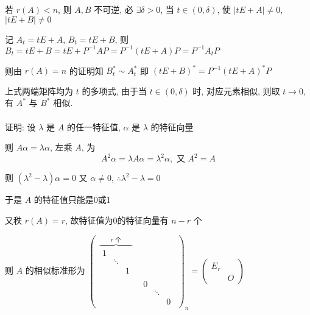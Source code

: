 		 若 \( r(A) < n \), 则 \( A, B \) 不可逆, 必 \( \exists \delta > 0 \), 当 \( t \in (0,\delta) \), 使 \( |tE+A| \neq 0 \), \( |tE+B| \neq 0 \)

		 记 \( A_{t} = tE+A \), \( B_{t} = tE+B \), 则 \( B_{t} = tE+B = tE+P^{-1}AP = P^{-1}(tE+A)P = P^{-1}A_{t}P \)

		 则由 \( r(A) = n \) 的证明知 \( B_{t}^{*} \sim A_{t}^{*} \) 即 \( (tE+B)^{*} = P^{-1}(tE+A)^{*}P \)

		 上式两端矩阵均为 \( t \) 的多项式, 由于当 \( t \in (0,\delta) \) 时, 对应元素相似, 则取 \( t \to 0 \), 有 \( A^{*} \) 与 \( B^{*} \) 相似.


	 \paragraph{} %
		 证明: 设 \( \lambda \) 是 \( A \) 的任一特征值, \( \alpha \) 是 \( \lambda \) 的特征向量

		 则 \( A\alpha = \lambda\alpha \), 左乘 \( A \), 为
		 \[ A^{2}\alpha = \lambda A\alpha = \lambda^{2}\alpha, \text{ 又 } A^{2} = A \]

		 则 \( (\lambda^{2}-\lambda)\alpha = 0 \) 又 \( \alpha \neq 0 \), \( \therefore \lambda^{2}-\lambda = 0 \)

		 于是 \( A \) 的特征值只能是0或1

		 又秩 \( r(A) = r \), 故特征值为0的特征向量有 \( n-r \) 个

		 则 \( A \) 的相似标准形为 \( \begin{pmatrix}
			 \overbrace{\begin{matrix}
					            1 &        &   \\
					              & \ddots &   \\
					              &        & 1
				            \end{matrix}}^{r \text{ 个}} &     \\
			                             & \begin{matrix}
				                               0 &        &   \\
				                                 & \ddots &   \\
				                                 &        & 0
			                               \end{matrix}
		 \end{pmatrix}_{n} = \begin{pmatrix}
			 E_{r} &   \\
			       & O
		 \end{pmatrix} \)


